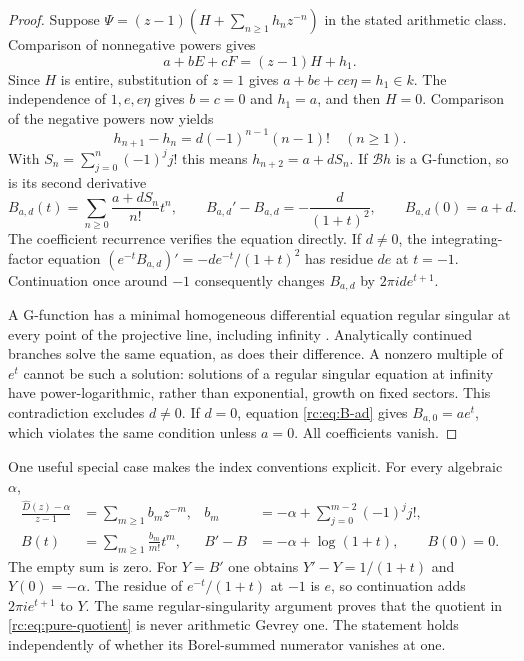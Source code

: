 \documentclass[11pt,a4paper]{article}
\theoremstyle{definition}
\theoremstyle{remark}
\theoremstyle{plain}
\numberwithin{equation}{section}
\begin{document}
\begin{proof}
Suppose $\Psi=(z-1)(H+\sum_{n\ge1}h_nz^{-n})$ in the stated arithmetic
class.  Comparison of nonnegative powers gives
\[
 a+bE+cF=(z-1)H+h_1.
\]
Since $H$ is entire, substitution of $z=1$ gives
$a+be+ce\eta=h_1\in k$.  The independence of $1,e,e\eta$ gives
$b=c=0$ and $h_1=a$, and then $H=0$.  Comparison of the negative powers
now yields
\[
 h_{n+1}-h_n=d(-1)^{n-1}(n-1)!\quad(n\ge1).
\]
With $S_n=\sum_{j=0}^n(-1)^jj!$ this means
$h_{n+2}=a+dS_n$.  If $\mathcal Bh$ is a G-function, so is its second
derivative
\begin{equation}\label{rc:eq:B-ad}
 B_{a,d}(t)=\sum_{n\ge0}\frac{a+dS_n}{n!}t^n,
 \qquad B_{a,d}'-B_{a,d}=-\frac d{(1+t)^2},
 \qquad B_{a,d}(0)=a+d.
\end{equation}
The coefficient recurrence verifies the equation directly.  If $d\ne0$,
the integrating-factor equation
$(e^{-t}B_{a,d})'=-de^{-t}/(1+t)^2$ has residue $de$ at $t=-1$.
Continuation once around $-1$ consequently changes $B_{a,d}$ by
$2\pi i d e^{t+1}$.

A G-function has a minimal homogeneous differential equation regular
singular at every point of the projective line, including infinity
\cite[\S1]{FRoperators}.  Analytically continued
branches solve the same equation, as does their difference.  A nonzero
multiple of $e^t$ cannot be such a solution: solutions of a regular
singular equation at infinity have power-logarithmic, rather than
exponential, growth on fixed sectors.  This contradiction excludes
$d\ne0$.  If $d=0$, equation \eqref{rc:eq:B-ad} gives $B_{a,0}=ae^t$,
which violates the same condition unless $a=0$.  All coefficients vanish.
\end{proof}

One useful special case makes the index conventions explicit.  For every
algebraic $\alpha$,
\begin{align}
 \frac{\widehat D(z)-\alpha}{z-1}
 &=\sum_{m\ge1}b_mz^{-m},&
 b_m&=-\alpha+\sum_{j=0}^{m-2}(-1)^jj!,\label{rc:eq:pure-quotient}\\
 B(t)&=\sum_{m\ge1}\frac{b_m}{m!}t^m,&
 B'-B&=-\alpha+\log(1+t),\qquad B(0)=0.\nonumber
\end{align}
The empty sum is zero.  For $Y=B'$ one obtains
$Y'-Y=1/(1+t)$ and $Y(0)=-\alpha$.  The residue of $e^{-t}/(1+t)$
at $-1$ is $e$, so continuation adds $2\pi i e^{t+1}$ to $Y$.
The same regular-singularity argument proves that the quotient in
\eqref{rc:eq:pure-quotient} is never arithmetic Gevrey one.  The statement
holds independently of whether its Borel-summed numerator vanishes at one.
\end{document}
